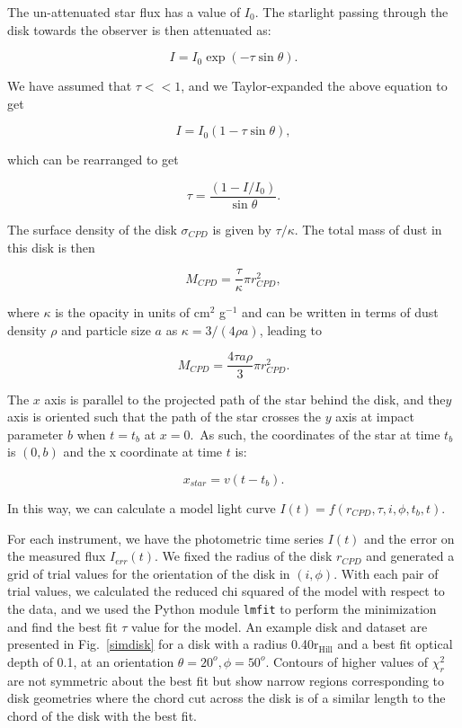\documentclass[longauth]{aa} %
\newcommand{\rhill}{$\mathrm{r_{Hill}}$} %
\begin{document}
The un-attenuated star flux has a value of $I_0$.
%
The starlight passing through the disk towards the observer is then attenuated as:

$$I=I_0 \exp (-\tau\sin \theta).$$

We have assumed that $\tau << 1$, and we Taylor-expanded the above equation to get

$$I = I_0(1-\tau\sin \theta),$$

which can be rearranged to get

$$\tau = \frac{(1-I/I_0)}{\sin \theta}. $$

The surface density of the disk $\sigma_{CPD}$ is given by $\tau/\kappa$. The total mass of dust in this disk is then

$$M_{CPD}=\frac{\tau}{\kappa} \pi r_{CPD}^2,$$

where $\kappa$ is the opacity in units of cm$^2$ g$^{-1}$ and can be written in terms of dust density $\rho$ and particle size $a$ as $\kappa=3/(4\rho a)$, leading to

$$M_{CPD}= \frac{4\tau a \rho}{3} \pi r_{CPD}^2.$$

The $x$ axis is parallel to the projected path of the star behind the disk, and the$ y$ axis is oriented such that the path of the star crosses the $y$ axis at impact parameter $b$ when $t = t_{b}$ at $x=0$.\ As such, the coordinates of the star at time $t_b$ is $(0,b)$ and the x coordinate at time $t$ is:

$$x_{star} = v(t-t_{b}).$$

In this way, we can calculate a model light curve $I(t)=f(r_{CPD},\tau,i,\phi,t_b,t)$.

For each instrument, we have the photometric time series $I(t)$ and the error on the measured flux $I_{err}(t)$.
%
We fixed the radius of the disk $r_{CPD}$ and generated a grid of trial values for the orientation of the disk in $(i,\phi)$.
%
With each pair of trial values, we calculated the reduced chi squared of the model with respect to the data, and we used the Python module {\tt lmfit} to perform the minimization and find the best fit $\tau$ value for the model.
%
An example disk and dataset are presented in Fig.~\ref{simdisk} for a disk with a radius 0.40\rhill{} and a best fit optical depth of 0.1, at an orientation $\theta=20^o, \phi=50^o$.
%
Contours of higher values of $\chi_{r}^2$ are not symmetric about the best fit but show narrow regions corresponding to disk geometries where the chord cut across the disk is of a similar length to the chord of the disk with the best fit.
\end{document}
